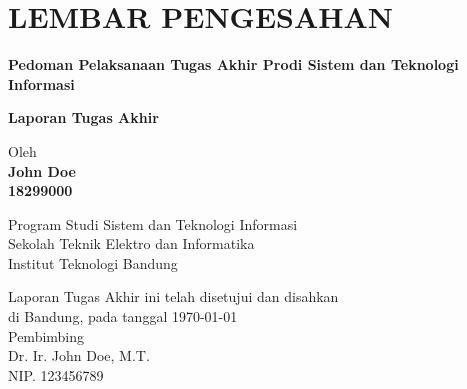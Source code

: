 \chapter*{LEMBAR PENGESAHAN}


\begin{center}
    \vspace{2cm}
  {\large\bfseries Pedoman Pelaksanaan Tugas Akhir Prodi Sistem dan Teknologi Informasi}\\
     \vspace{2cm}

  {\Large \textbf{Laporan Tugas Akhir}}\\


  \vspace{1.5cm}
    
    
  {\large Oleh}\\[0.3cm]
    \textbf{
    {\large John Doe}\\
    {\large 18299000}
  }\\
    
  \vspace{0.5cm}
 
  {\large Program Studi Sistem dan Teknologi Informasi}\\
  {\large Sekolah Teknik Elektro dan Informatika}\\
  {\large Institut Teknologi Bandung}\\

  \vspace{1.5cm}

  Laporan Tugas Akhir ini telah disetujui dan disahkan\\ 
  di Bandung, pada tanggal \today\\[1cm]

	Pembimbing  \\[3cm]
	Dr. Ir. John Doe, M.T.   \\[0.2cm]
	NIP. 123456789 

\end{center}

\vspace{1cm}
\noindent



